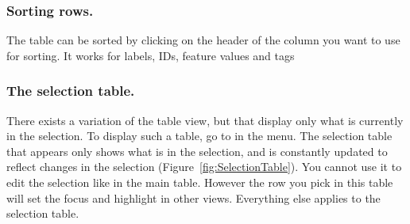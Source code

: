 \subsubsection{Sorting rows.}

The table can be sorted by clicking on the header of the column you want to use for sorting. 
It works for labels, IDs, feature values and tags

\subsubsection{The selection table.}

There exists a variation of the table view, but that display only what is currently in the selection.
To display such a table, go to  in the menu.
The selection table that appears only shows what is in the selection, and is constantly updated to reflect changes in the selection (Figure~\ref{fig:SelectionTable}).
You cannot use it to edit the selection like in the main table.
However the row you pick in this table will set the focus and highlight in other views.
Everything else applies to the selection table.

